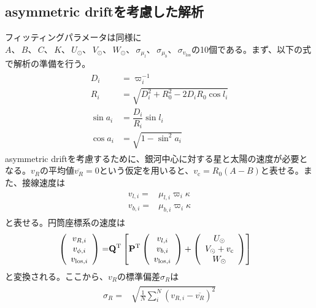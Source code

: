 \subsection{asymmetric driftを考慮した解析}
フィッティングパラメータは同様に$A、\,B、\,C、\,K、\,U_{\odot}、\,V_{\odot}、\,W_{\odot}、\,\sigma_{\mu_l}、\,\sigma_{\mu_b}、\,\sigma_{v_{\mathrm{los}}}$の10個である。まず、以下の式で解析の準備を行う。
\begin{align}
\begin{aligned}
	D_i &= \varpi_i^{-1}\\
	R_i &= \sqrt{D_i^2 + R_0^2 - 2D_iR_0\cos{l_i}}\\
	\sin{a_i} &= \dfrac{D_i}{R_i}\sin{l_i}\\
	\cos{a_i} &= \sqrt{1 - \sin^2{a_i}}
\end{aligned}
\end{align}
asymmetric driftを考慮するために、銀河中心に対する星と太陽の速度が必要となる。$v_R$の平均値$\overline{v_R}=0$という仮定を用いると、$v_{\mathrm{c}} = R_0(A-B)$と表せる。また、接線速度は
\begin{align}
\begin{aligned}
	v_{l,i} =& \mu_{l,i}\varpi_i \kappa\\
	v_{b,i} =& \mu_{b,i}\varpi_i \kappa
\end{aligned}
\end{align}
と表せる。円筒座標系の速度は
\begin{align}
\begin{aligned}
	\left(
	\begin{array}{c}
	 	v_{R,i}\\
		v_{\phi,i}\\
		v_{\mathrm{los},i}
	\end{array}
	\right)
	=& \bf{Q}^{\mathrm{T}} \left[\bf{P}^{\mathrm{T}}
	\left(
	\begin{array}{c}
	 	v_{l,i}\\
		v_{b,i}\\
		v_{\mathrm{los},i}
	\end{array}
	\right)
	+\left(
	\begin{array}{c}
	 	U_{\odot}\\
		V_{\odot} + v_{\mathrm{c}}\\
		W_{\odot}
	\end{array}
	\right)
	\right]
\end{aligned}
\end{align}
と変換される。ここから、$v_R$の標準偏差$\sigma_R$は
\begin{align}
\begin{aligned}
	\sigma_R =& \sqrt{\frac{1}{N}\sum^N_i(v_{R,i} - \overline{v_R})^2}
\end{aligned}
\end{align}
